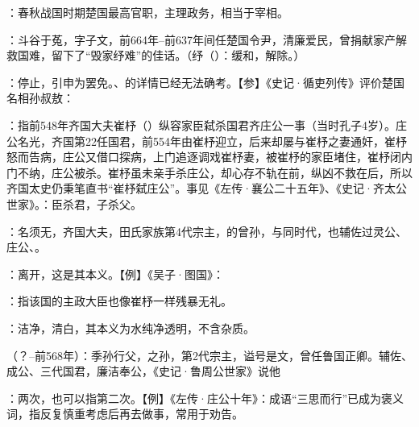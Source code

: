 {
\item {}：春秋战国时期楚国最高官职，主理政务，相当于宰相。
\item {}：斗谷于菟，字子文，前664年--前637年间任楚国令尹，清廉爱民，曾捐献家产解救国难，留下了“毁家纾难”的佳话。（纾（）：缓和，解除。）

\item {}：停止，引申为罢免。、的详情已经无法确考。【参】《史记·循吏列传》评价楚国名相孙叔敖：

\item {}：指前548年齐国大夫崔杼（）纵容家臣弑杀国君齐庄公一事（当时孔子4岁）。庄公名光，齐国第22任国君，前554年由崔杼迎立，后来却屡与崔杼之妻通奸，崔杼怒而告病，庄公又借口探病，上门追逐调戏崔杼妻，被崔杼的家臣堵住，崔杼闭内门不纳，庄公被杀。崔杼虽未亲手杀庄公，却心存不轨在前，纵凶不救在后，所以齐国太史仍秉笔直书“崔杼弑庄公”。事见《左传·襄公二十五年》、《史记·齐太公世家》。：臣杀君，子杀父。
\item {}：名须无，齐国大夫，田氏家族第4代宗主，的曾孙，与同时代，也辅佐过灵公、庄公、。
\item {}：离开，这是其本义。【例】《吴子·图国》：
\item {}：指该国的主政大臣也像崔杼一样残暴无礼。
\item {}：洁净，清白，其本义为水纯净透明，不含杂质。
}
{}


{
\item {}（？--前568年）：季孙行父，之孙，第2代宗主，谥号是文，曾任鲁国正卿。辅佐、成公、三代国君，廉洁奉公，《史记·鲁周公世家》说他
\item {}：两次，也可以指第二次。【例】《左传·庄公十年》：成语“三思而行”已成为褒义词，指反复慎重考虑后再去做事，常用于劝告。
}
{}


